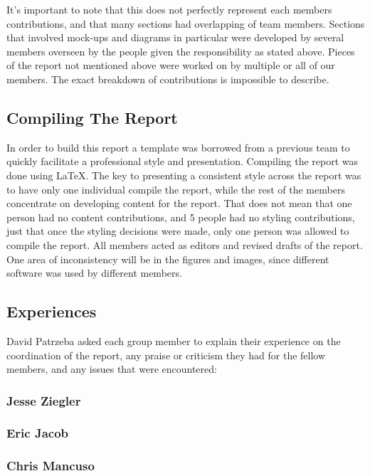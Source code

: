 It's important to note that this does not perfectly represent each members
contributions, and that many sections had overlapping of team members. Sections
that involved mock-ups and diagrams in particular were developed by several
members overseen by the people given the responsibility as stated above.
Pieces of the report not mentioned above were worked on by multiple or all of
our members. The exact breakdown of contributions is impossible to describe. \\

\subsection{Compiling The Report}
In order to build this report a template was borrowed from a previous team to
quickly facilitate a professional style and presentation.  Compiling the report
was done using \LaTeX.  The key to presenting a consistent style across the
report was to have only one individual compile the report, while the rest of
the members concentrate on developing content for the report.  That does not
mean that one person had no content contributions, and 5 people had no styling
contributions, just that once the styling decisions were made, only one person
was allowed to compile the report.  All members acted as editors and revised
drafts of the report.  One area of inconsistency will be in the figures and
images, since different software was used by different members.

\subsection{Experiences}
 David Patrzeba asked each group member to explain their experience on the
 coordination of the report, any praise or criticism they had for the fellow
 members, and any issues that were encountered:

\subsubsection{Jesse Ziegler}

\subsubsection{Eric Jacob}

\subsubsection{Chris Mancuso}

